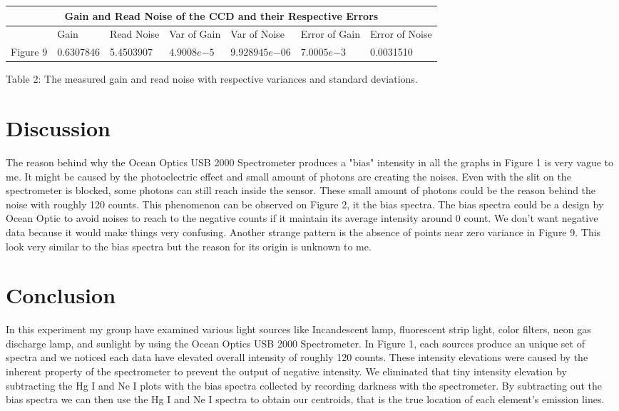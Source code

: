 \documentclass[onecolumn, 12pt, a4paper]{article}
\begin{document}
\hspace*{-1.5cm}\begin{tabular}{ |p{1.6cm}||p{2cm}|p{2cm}|p{2cm}|p{2.4cm}|p{2.3cm}|p{2cm}| }
 \hline
 \multicolumn{7}{|c|}{Gain and Read Noise of the CCD and their Respective Errors} \\
 \hline
 & Gain& Read Noise & Var of Gain & Var of Noise & Error of Gain & Error of Noise\\
 \hline
 Figure 9 &  0.6307846 & 5.4503907 & $4.9008e{-5}$ & $9.928945e{-06}$ & $7.0005e{-3}$ & 0.0031510\\
 
 \hline
\end{tabular}
\newline
\begin{flushleft}
Table 2: The measured gain and read noise with respective variances and standard deviations.
\end{flushleft}

\section{Discussion}\label{Dis}
The reason behind why the Ocean Optics USB 2000 Spectrometer produces a "bias" intensity in all the graphs in Figure 1 is very vague to me. It might be caused by the photoelectric effect and small amount of photons are creating the noises. Even with the slit on the spectrometer is blocked, some photons can still reach inside the sensor. These small amount of photons could be the reason behind the noise with roughly 120 counts. This phenomenon can be observed on Figure 2, it the bias spectra. The bias spectra could be a design by Ocean Optic to avoid noises to reach to the negative counts if it maintain its average intensity around 0 count. We don't want negative data because it would make things very confusing. Another strange pattern is the absence of points near zero variance in Figure 9. This look very similar to the bias spectra but the reason for its origin is unknown to me.

\section{Conclusion}\label{Conc}
In this experiment my group have examined various light sources like Incandescent lamp, fluorescent strip light, color filters, neon gas discharge lamp, and sunlight by using the Ocean Optics USB 2000 Spectrometer. In Figure 1, each sources produce an unique set of spectra and we noticed each data have elevated overall intensity of roughly 120 counts. These intensity elevations were caused by the inherent property of the spectrometer to prevent the output of negative intensity. We eliminated that tiny intensity elevation by subtracting the Hg I and Ne I plots with the bias spectra collected by recording darkness with the spectrometer. By subtracting out the bias spectra we can then use the Hg I and Ne I spectra to obtain our centroids, that is the true location of each element's emission lines.
\end{document}
